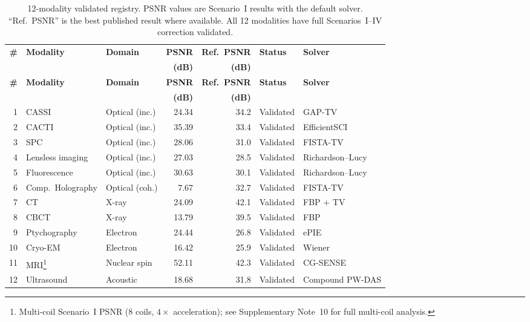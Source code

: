 \documentclass[11pt]{article}
\begin{document}
\begin{longtable}{r l l r r l l}
\caption{12-modality validated registry.  PSNR values are Scenario~I results
with the default solver.  ``Ref.\ PSNR'' is the best published result where
available.  All 12 modalities have full Scenarios~I--IV correction validated.}
\label{tab:26mod} \\
\toprule
\textbf{\#} & \textbf{Modality} & \textbf{Domain} &
  \textbf{PSNR} & \textbf{Ref.\ PSNR} & \textbf{Status} & \textbf{Solver} \\
  & & & \textbf{(dB)} & \textbf{(dB)} & & \\
\midrule
\endfirsthead
\toprule
\textbf{\#} & \textbf{Modality} & \textbf{Domain} &
  \textbf{PSNR} & \textbf{Ref.\ PSNR} & \textbf{Status} & \textbf{Solver} \\
  & & & \textbf{(dB)} & \textbf{(dB)} & & \\
\midrule
\endhead
\bottomrule
\endlastfoot
1  & CASSI                & Optical (inc.) & 24.34 & 34.2  & Validated & GAP-TV \\
2  & CACTI                & Optical (inc.) & 35.39 & 33.4  & Validated & EfficientSCI \\
3  & SPC                  & Optical (inc.) & 28.06 & 31.0  & Validated & FISTA-TV \\
4  & Lensless imaging     & Optical (inc.) & 27.03 & 28.5  & Validated & Richardson--Lucy \\
5  & Fluorescence         & Optical (inc.) & 30.63 & 30.1  & Validated & Richardson--Lucy \\
6  & Comp.\ Holography    & Optical (coh.) &  7.67 & 32.7  & Validated & FISTA-TV \\
7  & CT                   & X-ray          & 24.09 & 42.1  & Validated & FBP + TV \\
8  & CBCT                 & X-ray          & 13.79 & 39.5  & Validated & FBP \\
9  & Ptychography         & Electron       & 24.44 & 26.8  & Validated & ePIE \\
10 & Cryo-EM              & Electron       & 16.42 & 25.9  & Validated & Wiener \\
11 & MRI\footnote{Multi-coil Scenario~I PSNR (8 coils, $4\times$ acceleration); see Supplementary Note~10 for full multi-coil analysis.} & Nuclear spin & 52.11 & 42.3 & Validated & CG-SENSE \\
12 & Ultrasound           & Acoustic       & 18.68 & 31.8  & Validated & Compound PW-DAS \\
\end{longtable}
\end{document}
